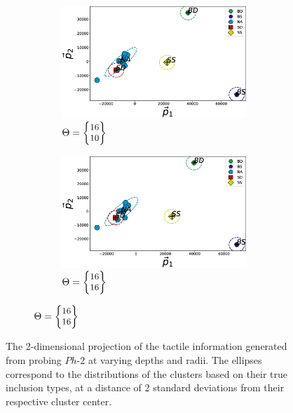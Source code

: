 \begin{figure}[]
\begin{subfigure}[b]{\textwidth}
		\vspace{4pt}
	\end{subfigure}
	\begin{subfigure}[b]{\textwidth}
		\begin{subfigure}[b]{0.48\textwidth}
			\includegraphics[width=\textwidth]{./figs/phantom1properties_clsplt_Rotate-d160-r100.eps}
			\caption{$\Theta = \small{\begin{Bmatrix}16\\ 10\end{Bmatrix}}$}
			\label{ResRot:160-100}
		\end{subfigure}
		\hspace{0.01\textwidth}
		\begin{subfigure}[b]{0.48\textwidth}
			\includegraphics[width=\textwidth]{./figs/phantom1properties_clsplt_Rotate-d160-r160.eps}
			\caption{$\Theta = \small{\begin{Bmatrix}16\\ 16\end{Bmatrix}}$}
			\label{ResRot:160-160}
		\end{subfigure}
	\end{subfigure}
	\caption{The 2-dimensional projection of the tactile information generated from probing $Ph\text{-}2$ 
		at varying depths and radii. The ellipses correspond to the distributions of the clusters based on 
		their true inclusion types, at a distance of 2 standard deviations from their respective cluster center.}
	\label{ResRot}
\end{figure}

